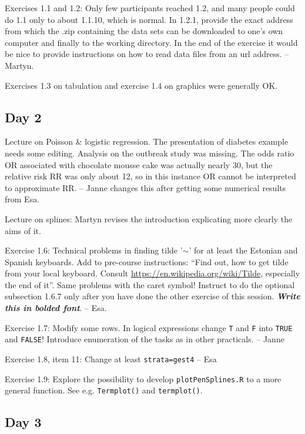 \documentclass[11pt,a4]{article}
\begin{document}
Exercises 1.1 and 1.2: Only few participants reached 1.2, and many people could do 1.1 only to about 1.1.10, which is normal. 
In 1.2.1, provide the exact address from which the .zip containing the data sets can be downloaded to one's own computer and finally to the working directory.
In the end of the exercise it would be nice to provide instructions on how to read data files from an url address. -- Martyn.

Exercises 1.3 on tabulation and exercise 1.4 on graphics were generally OK. 

\subsection*{Day 2}

Lecture on Poisson \& logistic regression. 
The presentation of diabetes example needs some editing.
Analysis on the outbreak study was missing. 
The odds ratio OR associated with chocolate mousse cake was actually nearly 30, but the relative risk RR was only about 12, so in this instance OR cannot be interpreted to approximate RR.
-- Janne changes this after getting some numerical results from Esa.

Lecture on splines: Martyn revises the introduction explicating more clearly the aims of it.

Exercise 1.6: Technical problems in finding tilde '$\sim$' for at least the Estonian and Spanish keyboards. 
Add to pre-course instructions: ``Find out, how to get tilde from your local keyboard. 
Consult \url{https://en.wikipedia.org/wiki/Tilde}, especially the end of it''.
Same problems with the caret symbol! 
Instruct to do the optional subsection 1.6.7 only after you have done the other 
exercise of this session. \textbf{\textit{Write this in bolded font}}.
-- Esa.

Exercise 1.7: Modify some rows.
In logical expressions change {\tt T} and {\tt F} into {\tt TRUE} and {\tt FALSE}!
Introduce enumeration of the tasks as in other practicals.
 -- Janne


Exercise 1.8, item 11: Change at least {\tt strata=gest4} -- Esa

Exercise 1.9: Explore the possibility to develop {\tt plotPenSplines.R}
 to a more general function.
See e.g. {\tt Termplot()} and {\tt termplot()}. 

\subsection*{Day 3}
\end{document}
